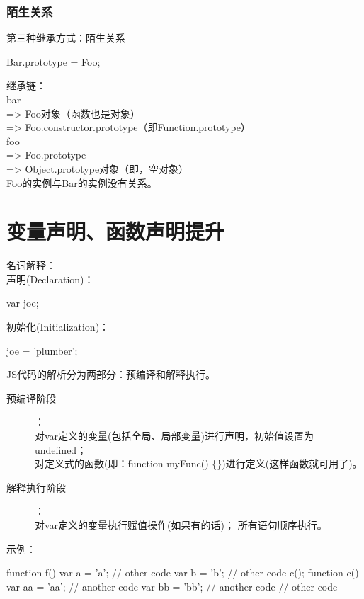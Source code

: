 \subsubsection[陌生关系]{陌生关系}
第三种继承方式：陌生关系

\begin{javascriptcode}
  Bar.prototype = Foo;
\end{javascriptcode}

继承链：\\
bar\\
=> Foo对象（函数也是对象）\\
=> Foo.constructor.prototype（即Function.prototype）\\
foo\\
=> Foo.prototype\\
=> Object.prototype对象（即{}，空对象）\\
Foo的实例与Bar的实例没有关系。


\section[变量声明、函数声明提升]{变量声明、函数声明提升}
名词解释：\\
声明(Declaration)：\\
\begin{javascriptcode}
  var joe;
\end{javascriptcode}

初始化(Initialization)：\\
\begin{javascriptcode}
  joe = 'plumber';
\end{javascriptcode}

JS代码的解析分为两部分：预编译和解释执行。
\begin{description}
  \item[预编译阶段]：\\
    对var定义的变量(包括全局、局部变量)进行声明，初始值设置为undefined；\\
    对定义式的函数(即：function myFunc() \{\})进行定义(这样函数就可用了)。
  \item[解释执行阶段]：\\
    对var定义的变量执行赋值操作(如果有的话)；
    所有语句顺序执行。
\end{description}

示例：\\
\begin{javascriptcode}
  function f() {
    var a = 'a';
    // other code
    var b = 'b';
    // other code
    c();
    function c() {
      var aa = 'aa';
      // another code
      var bb = 'bb';
      // another code
    }
    // other code
  }
\end{javascriptcode}

